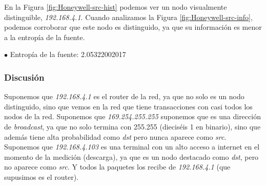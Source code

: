 En la Figura \ref{fig:Honeywell-src-hist} podemos ver un nodo visualmente distinguible, \emph{192.168.4.1}.
Cuando analizamos la Figura \ref{fig:Honeywell-src-info}, podemos corroborar que este nodo es distinguido, ya que su información es menor a la entropía de la fuente.

$\bullet$ Entropía de la fuente: 2.05322002017



\subsubsection{Discusión}

Suponemos que \emph{192.168.4.1} es el router de la red, ya que no solo es un nodo distinguido, sino que vemos en la red que tiene transacciones con casi todos los nodos de la red.
Suponemos que \emph{169.254.255.255} suponemos que es una dirección de \emph{broadcast}, ya que no solo termina con 255.255 (dieciséis 1 en binario), sino que además tiene alta probabilidad como \emph{dst} pero nunca aparece como \emph{src}.
Suponemos que \emph{192.168.4.103} es una terminal con un alto acceso a internet en el momento de la medición (descarga), ya que es un nodo destacado como \emph{dst}, pero no aparece como \emph{src}. Y todos la paquetes los recibe de \emph{192.168.4.1} (que supusimos es el router). 
